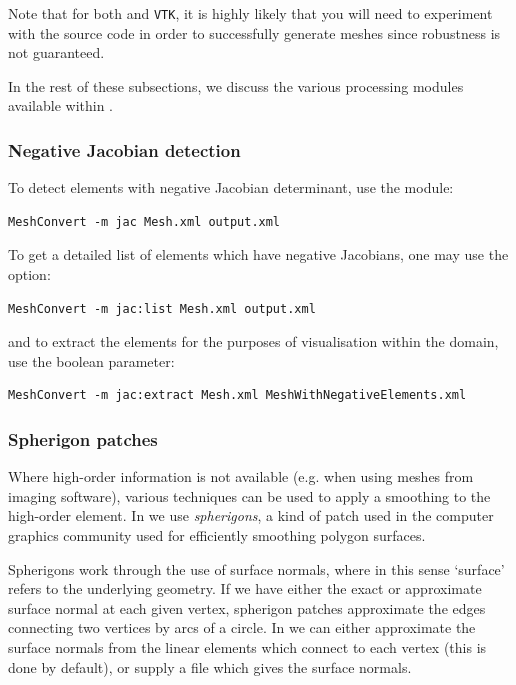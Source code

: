 Note that for both \gmsh and \texttt{VTK}, it is highly likely that you will
need to experiment with the source code in order to successfully generate
meshes since robustness is not guaranteed.

In the rest of these subsections, we discuss the various processing modules
available within \mc.

\subsubsection{Negative Jacobian detection}

To detect elements with negative Jacobian determinant, use the 
module:
%
\begin{lstlisting}[style=BashInputStyle]
MeshConvert -m jac Mesh.xml output.xml
\end{lstlisting}
%
To get a detailed list of elements which have negative Jacobians, one may use
the  option:
%
\begin{lstlisting}[style=BashInputStyle]
MeshConvert -m jac:list Mesh.xml output.xml
\end{lstlisting}
%
and to extract the elements for the purposes of visualisation within the domain,
use the  boolean parameter:
%
\begin{lstlisting}[style=BashInputStyle]
MeshConvert -m jac:extract Mesh.xml MeshWithNegativeElements.xml
\end{lstlisting}

\subsubsection{Spherigon patches}

Where high-order information is not available (e.g. when using meshes from
imaging software), various techniques can be used to apply a smoothing to the
high-order element. In \mc we use \emph{spherigons}, a kind of patch used in the
computer graphics community used for efficiently smoothing polygon surfaces.

Spherigons work through the use of surface normals, where in this sense
`surface' refers to the underlying geometry. If we have either the exact or
approximate surface normal at each given vertex, spherigon patches approximate
the edges connecting two vertices by arcs of a circle. In \mc we can either
approximate the surface normals from the linear elements which connect to each
vertex (this is done by default), or supply a file which gives the surface
normals.

